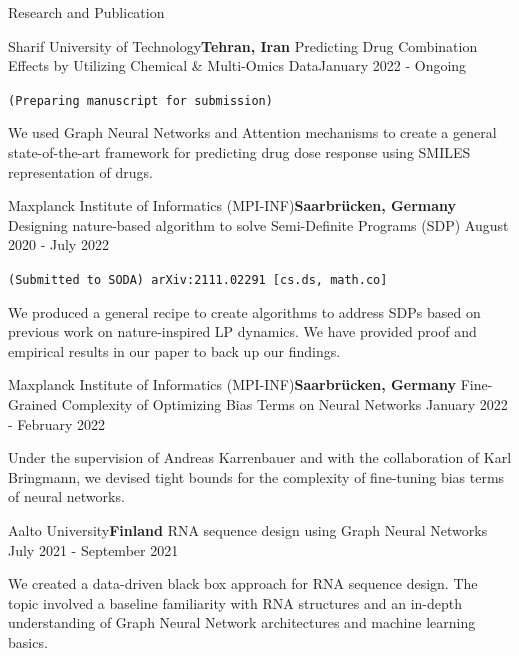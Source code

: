\documentclass{resume} %
\begin{document}
\begin{rSection}{Research and Publication}


\begin{rSubsection}{Sharif University of Technology}{\textcolor{Black!70}{\bf Tehran, Iran}}
{Predicting Drug Combination Effects by Utilizing Chemical \& Multi-Omics Data}{\textcolor{Black!70}{January 2022 - Ongoing}}
\item {\tt (Preparing manuscript for submission)}
\begin{small}
\item We used Graph Neural Networks and Attention mechanisms to create a general state-of-the-art framework for predicting drug dose response using SMILES representation of drugs.
\end{small}
\end{rSubsection}


\begin{rSubsection}{Maxplanck Institute of Informatics (MPI-INF)}{\textcolor{Black!70}{\bf Saarbrücken, Germany}}
{Designing nature-based algorithm to solve Semi-Definite Programs (SDP)}
{\textcolor{Black!70}{August 2020 - July 2022}}
\item {\tt(Submitted to SODA) arXiv:2111.02291 [cs.ds, math.co]} \begin{small}
\item We produced a general recipe to create algorithms to address SDPs based on previous work on nature-inspired LP dynamics. We have provided proof and empirical results in our paper to back up our findings.
\end{small}
\end{rSubsection}
\begin{rSubsection}{Maxplanck Institute of Informatics (MPI-INF)}{\textcolor{Black!70}{\bf Saarbrücken, Germany}}
{Fine-Grained Complexity of Optimizing Bias Terms on Neural Networks}
{\textcolor{Black!70}{January 2022 - February 2022}}
\begin{small}
\item Under the supervision of Andreas Karrenbauer and with the collaboration of Karl Bringmann, we devised tight bounds for the complexity of fine-tuning bias terms of neural networks.
\end{small}
\end{rSubsection}

\begin{rSubsection}{Aalto University}{\textcolor{Black!70}{\bf Finland}}
{RNA sequence design using Graph Neural Networks}
{\textcolor{Black!70}{July 2021 - September 2021}}{}
\begin{small}
\item We created a data-driven black box approach for RNA sequence design. The topic involved a baseline familiarity with RNA structures and an in-depth understanding of Graph Neural Network architectures and machine learning basics.
\end{small}
\end{rSubsection}

\end{rSection}
\end{document}
